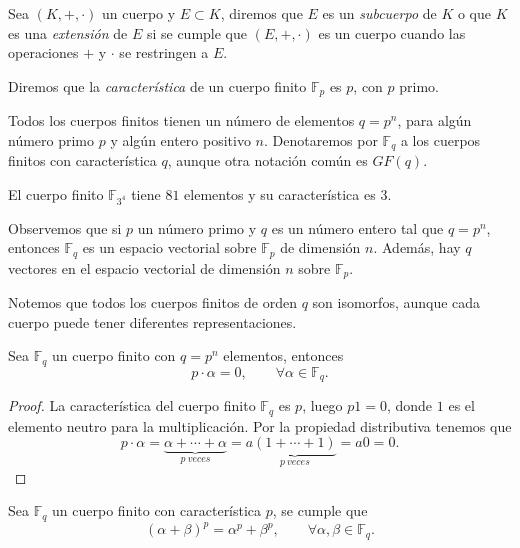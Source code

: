 Sea $(K, +, \cdot)$ un cuerpo y $E \subset K$, diremos que $E$ es un \emph{subcuerpo} de $K$ o que $K$ es una \emph{extensión} de $E$ si se cumple que $(E, +, \cdot)$ es un cuerpo cuando las operaciones $+$ y $\cdot$ se restringen a $E$.

Diremos que la \emph{característica} de un cuerpo finito $\mathbb{F}_p$ es $p$, con $p$ primo.

Todos los cuerpos finitos tienen un número de elementos $q = p^n$, para algún número primo $p$ y algún entero positivo $n$. Denotaremos por $\mathbb{F}_q$ a los cuerpos finitos con característica $q$, aunque otra notación común es $GF(q)$.

\begin{exampleth}
    El cuerpo finito $\mathbb{F}_{3^4}$ tiene $81$ elementos y su característica es $3$.
\end{exampleth}

Observemos que si $p$ un número primo y $q$ es un número entero tal que $q = p^n$, entonces $\mathbb{F}_q$ es un espacio vectorial sobre $\mathbb{F}_p$ de dimensión $n$. Además, hay $q$ vectores en el espacio vectorial de dimensión $n$ sobre $\mathbb{F}_p$.

Notemos que todos los cuerpos finitos de orden $q$ son isomorfos, aunque cada cuerpo puede tener diferentes representaciones.

\begin{proposition}
    \label{prop:multiplo-p}
    Sea $\mathbb{F}_q$ un cuerpo finito con $q = p^n$ elementos, entonces 
    \[
        p \cdot \alpha = 0, \qquad \forall \alpha \in \mathbb{F}_q.
    \]
\end{proposition}

\begin{proof}
    La característica del cuerpo finito $\mathbb{F}_q$ es $p$, luego $p1 = 0$, donde $1$ es el elemento neutro para la multiplicación. Por la propiedad distributiva tenemos que
    \[
        p \cdot \alpha = \underbrace{\alpha + \cdots + \alpha}_{p\ veces} = a \underbrace{(1 + \cdots + 1)}_{p\ veces} = a0 = 0.
    \]
\end{proof}

\begin{proposition}
    Sea $\mathbb{F}_q$ un cuerpo finito con característica $p$, se cumple que
    \[
        ( \alpha + \beta )^p = \alpha^p + \beta^p, \qquad \forall \alpha, \beta \in \mathbb{F}_q.
    \]
\end{proposition}

